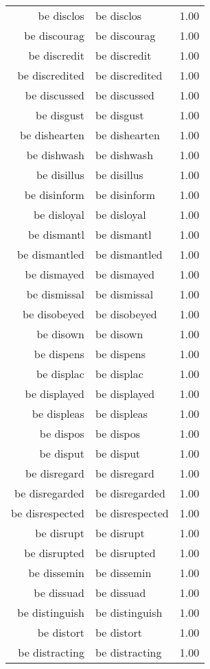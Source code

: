 \begin{table}[ht]
\begin{tabular}{rlr}
  be disclos & be disclos & 1.00 \\ 
  be discourag & be discourag & 1.00 \\ 
  be discredit & be discredit & 1.00 \\ 
  be discredited & be discredited & 1.00 \\ 
  be discussed & be discussed & 1.00 \\ 
  be disgust & be disgust & 1.00 \\ 
  be dishearten & be dishearten & 1.00 \\ 
  be dishwash & be dishwash & 1.00 \\ 
  be disillus & be disillus & 1.00 \\ 
  be disinform & be disinform & 1.00 \\ 
  be disloyal & be disloyal & 1.00 \\ 
  be dismantl & be dismantl & 1.00 \\ 
  be dismantled & be dismantled & 1.00 \\ 
  be dismayed & be dismayed & 1.00 \\ 
  be dismissal & be dismissal & 1.00 \\ 
  be disobeyed & be disobeyed & 1.00 \\ 
  be disown & be disown & 1.00 \\ 
  be dispens & be dispens & 1.00 \\ 
  be displac & be displac & 1.00 \\ 
  be displayed & be displayed & 1.00 \\ 
  be displeas & be displeas & 1.00 \\ 
  be dispos & be dispos & 1.00 \\ 
  be disput & be disput & 1.00 \\ 
  be disregard & be disregard & 1.00 \\ 
  be disregarded & be disregarded & 1.00 \\ 
  be disrespected & be disrespected & 1.00 \\ 
  be disrupt & be disrupt & 1.00 \\ 
  be disrupted & be disrupted & 1.00 \\ 
  be dissemin & be dissemin & 1.00 \\ 
  be dissuad & be dissuad & 1.00 \\ 
  be distinguish & be distinguish & 1.00 \\ 
  be distort & be distort & 1.00 \\ 
  be distracting & be distracting & 1.00 \\ 

\end{tabular}
\end{table}
